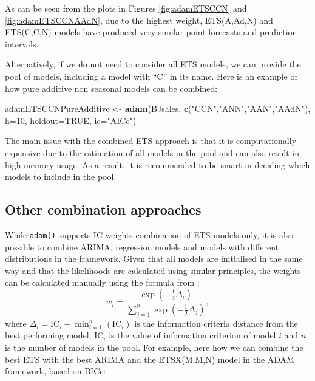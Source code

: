 \documentclass[]{book}
\newenvironment{Shaded}{\begin{snugshade}}{\end{snugshade}}
\newcommand{\DataTypeTok}[1]{\textcolor[rgb]{0.13,0.29,0.53}{#1}}
\newcommand{\DecValTok}[1]{\textcolor[rgb]{0.00,0.00,0.81}{#1}}
\newcommand{\KeywordTok}[1]{\textcolor[rgb]{0.13,0.29,0.53}{\textbf{#1}}}
\newcommand{\NormalTok}[1]{#1}
\newcommand{\OtherTok}[1]{\textcolor[rgb]{0.56,0.35,0.01}{#1}}
\newcommand{\StringTok}[1]{\textcolor[rgb]{0.31,0.60,0.02}{#1}}
\theoremstyle{definition}
\theoremstyle{definition}
\theoremstyle{definition}
\theoremstyle{definition}
\theoremstyle{remark}
\begin{document}
As can be seen from the plots in Figures \ref{fig:adamETSCCN} and \ref{fig:adamETSCCNAAdN}, due to the highest weight, ETS(A,Ad,N) and ETS(C,C,N) models have produced very similar point forecasts and prediction intervals.

Alternatively, if we do not need to consider all ETS models, we can provide the pool of models, including a model with ``C'' in its name. Here is an example of how pure additive non seasonal models can be combined:

\begin{Shaded}
\begin{Highlighting}[]
\NormalTok{adamETSCCNPureAdditive <-}\StringTok{ }\KeywordTok{adam}\NormalTok{(BJsales, }
                               \KeywordTok{c}\NormalTok{(}\StringTok{"CCN"}\NormalTok{,}\StringTok{"ANN"}\NormalTok{,}\StringTok{"AAN"}\NormalTok{,}\StringTok{"AAdN"}\NormalTok{), }
                               \DataTypeTok{h=}\DecValTok{10}\NormalTok{, }\DataTypeTok{holdout=}\OtherTok{TRUE}\NormalTok{,}
                               \DataTypeTok{ic=}\StringTok{"AICc"}\NormalTok{)}
\end{Highlighting}
\end{Shaded}

The main issue with the combined ETS approach is that it is computationally expensive due to the estimation of all models in the pool and can also result in high memory usage. As a result, it is recommended to be smart in deciding which models to include in the pool.

\hypertarget{other-combination-approaches}{%
\subsection{Other combination approaches}\label{other-combination-approaches}}

While \texttt{adam()} supports IC weights combination of ETS models only, it is also possible to combine ARIMA, regression models and models with different distributions in the framework. Given that all models are initialised in the same way and that the likelihoods are calculated using similar principles, the weights can be calculated manually using the formula from \citet{Burnham2004}:
\begin{equation}
    w_i = \frac{\exp\left(-\frac{1}{2}\Delta_i\right)}{\sum_{j=1}^n \exp\left(-\frac{1}{2}\Delta_j\right)},
  \label{eq:ETSADAMStateSpaceEstimated}
\end{equation}
where \(\Delta_i=\mathrm{IC}_i -\min_{i=1}^n \left(\mathrm{IC}_i\right)\) is the information criteria distance from the best performing model, \(\mathrm{IC}_i\) is the value of information criterion of model \(i\) and \(n\) is the number of models in the pool. For example, here how we can combine the best ETS with the best ARIMA and the ETSX(M,M,N) model in the ADAM framework, based on BICc:
\end{document}
